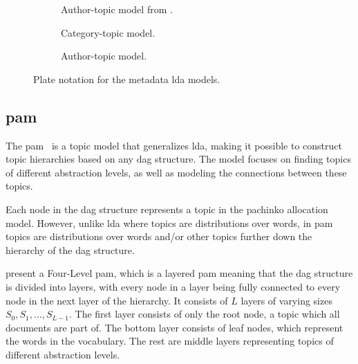 \begin{figure*}[ht]
	\centering
	\begin{subfigure}{0.275\textwidth}
		\centering
		\resizebox{\textwidth}{!}{%
			
		}
		\caption{Author-topic model from \cite{author_topic_2012}.}
		\label{fig:original_author_lda}
	\end{subfigure}
	\hspace{2em}
	\begin{subfigure}{0.275\textwidth}
		\centering
		\resizebox{\textwidth}{!}{%
			
		}
		\caption{Category-topic model.}
		\label{fig:category_lda}
	\end{subfigure}
	\hspace{2em}
	\begin{subfigure}{0.275\textwidth}
		\centering
		\resizebox{\textwidth}{!}{%
			
		}
		\caption{Author-topic model.}
		\label{fig:author_lda}
	\end{subfigure}	
	\caption{Plate notation for the metadata \gls{lda} models.}
	\label{fig:metadata_lda}
\end{figure*}

\subsection{\acrlong{pam}}\label{subsec:pachinko_prelim}
The \acrfull{pam}~\cite{li2006pachinko} is a topic model that generalizes \gls{lda}, making it possible to construct topic hierarchies based on any \gls{dag} structure.
The model focuses on finding topics of different abstraction levels, as well as modeling the connections between these topics.

Each node in the \gls{dag} structure represents a topic in the pachinko allocation model. 
However, unlike \gls{lda} where topics are distributions over words, in \gls{pam} topics are distributions over words and/or other topics further down the hierarchy of the \gls{dag} structure.

\citet{li2006pachinko} present a Four-Level \gls{pam}, which is a layered \gls{pam} meaning that the \gls{dag} structure is divided into layers, with every node in a layer being fully connected to every node in the next layer of the hierarchy.
It consists of $L$ layers of varying sizes $S_0, S_1, \dots, S_{L-1}$.
The first layer consists of only the root node, a topic which all documents are part of.
The bottom layer consists of leaf nodes, which represent the words in the vocabulary.
The rest are middle layers representing topics of different abstraction levels.


